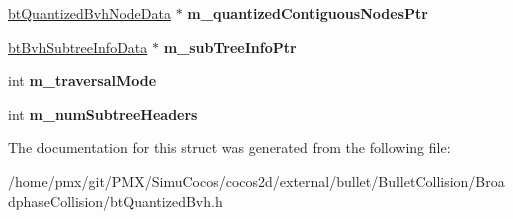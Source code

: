 \begin{DoxyCompactItemize}
\hyperlink{structbtQuantizedBvhNodeData}{bt\+Quantized\+Bvh\+Node\+Data} $\ast$ {\bfseries m\+\_\+quantized\+Contiguous\+Nodes\+Ptr}
\item 
\mbox{\label{structbtQuantizedBvhFloatData_ac34ffe41d4a75556ce26952d7a819838}} 
\hyperlink{structbtBvhSubtreeInfoData}{bt\+Bvh\+Subtree\+Info\+Data} $\ast$ {\bfseries m\+\_\+sub\+Tree\+Info\+Ptr}
\item 
\mbox{\label{structbtQuantizedBvhFloatData_a3a4a6152f77b1903d43f385d4028a68d}} 
int {\bfseries m\+\_\+traversal\+Mode}
\item 
\mbox{\label{structbtQuantizedBvhFloatData_a112edc65a5bdd7449e0976a282b90da4}} 
int {\bfseries m\+\_\+num\+Subtree\+Headers}
\end{DoxyCompactItemize}


The documentation for this struct was generated from the following file\+:\begin{DoxyCompactItemize}
\item 
/home/pmx/git/\+P\+M\+X/\+Simu\+Cocos/cocos2d/external/bullet/\+Bullet\+Collision/\+Broadphase\+Collision/bt\+Quantized\+Bvh.\+h\end{DoxyCompactItemize}
